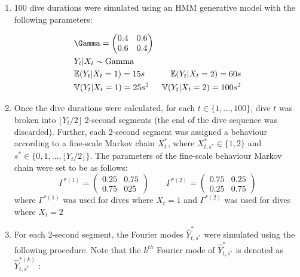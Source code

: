 \begin{enumerate}
	\item 100 dive durations were simulated using an HMM generative model with the following parameters:
	
	\begin{align*}
		&\Gamma = \begin{pmatrix} 0.4 & 0.6 \\ 0.6 & 0.4 \end{pmatrix} & \\
		&Y_t|X_t \sim \rm{Gamma} & \\
		&\bbE(Y_t|X_t = 1) = 15 s &\bbE(Y_t|X_t = 2) = 60 s \\
		&\bbV(Y_t|X_t = 1) = 25 s^2 &\bbV(Y_t|X_t = 2) = 100 s^2
	\end{align*}
	
	\item Once the dive durations were calculated, for each $t \in \{1, \ldots, 100\}$, dive $t$ was broken into $\lfloor Y_t/2 \rfloor$ 2-second segments (the end of the dive sequence was discarded). Further, each 2-second segment was assigned a behaviour according to a fine-scale Markov chain $X^*_t$, where $X^*_{t,s^*} \in \{1,2\}$ and $s^* \in \{0,1,\ldots,\lfloor Y_t/2 \rfloor\}$. The parameters of the fine-scale behaviour Markov chain were set to be as follows:
	$$\Gamma^{*(1)} = \begin{pmatrix} 0.25 & 0.75 \\ 0.75 & 025 \end{pmatrix} \qquad 	\Gamma^{*(2)} = \begin{pmatrix} 0.75 & 0.25 \\ 0.25 & 0.75 \end{pmatrix}$$
	where $\Gamma^{*(1)}$ was used for dives where $X_t = 1$ and $\Gamma^{*(2)}$ was used for dives where $X_t = 2$
	
	\item For each 2-second segment, the Fourier modes $\hat{Y}^*_{t,s^*}$ were simulated using the following procedure. Note that the $k^{th}$ Fourier mode of $\hat{Y}^*_{t,s^*}$ is denoted as $\hat{Y}^{*(k)}_{t,s^*}$ :
	

\end{enumerate}
